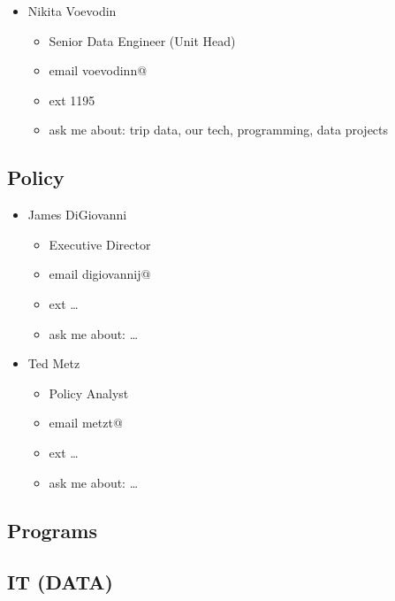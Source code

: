 \documentclass[
]{book}
\providecommand{\tightlist}{%
  \setlength{\itemsep}{0pt}\setlength{\parskip}{0pt}}
\begin{document}
\begin{itemize}
\tightlist
\item
  Nikita Voevodin

  \begin{itemize}
  \tightlist
  \item
    Senior Data Engineer (Unit Head)
  \item
    email voevodinn@
  \item
    ext 1195
  \item
    ask me about: trip data, our tech, programming, data projects
  \end{itemize}
\end{itemize}

\hypertarget{policy}{%
\subsection{Policy}\label{policy}}

\begin{itemize}
\tightlist
\item
  James DiGiovanni

  \begin{itemize}
  \tightlist
  \item
    Executive Director
  \item
    email digiovannij@
  \item
    ext \ldots{}
  \item
    ask me about: \ldots{}
  \end{itemize}
\item
  Ted Metz

  \begin{itemize}
  \tightlist
  \item
    Policy Analyst
  \item
    email metzt@
  \item
    ext \ldots{}
  \item
    ask me about: \ldots{}
  \end{itemize}
\end{itemize}

\hypertarget{programs}{%
\subsection{Programs}\label{programs}}

\hypertarget{it-data}{%
\subsection{IT (DATA)}\label{it-data}}
\end{document}
